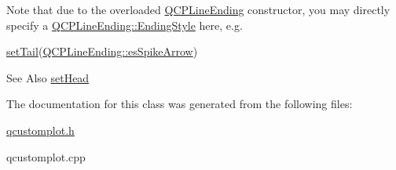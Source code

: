 Note that due to the overloaded \hyperlink{classQCPLineEnding}{Q\-C\-P\-Line\-Ending} constructor, you may directly specify a \hyperlink{classQCPLineEnding_a5ef16e6876b4b74959c7261d8d4c2cd5}{Q\-C\-P\-Line\-Ending\-::\-Ending\-Style} here, e.\-g.
\begin{DoxyCode}
\hyperlink{classQCPItemCurve_ac3488d8b1a6489c845dc5bff3ef71124}{setTail}(\hyperlink{classQCPLineEnding_a5ef16e6876b4b74959c7261d8d4c2cd5ab9964d0d03f812d1e79de15edbeb2cbf}{QCPLineEnding::esSpikeArrow}) 
\end{DoxyCode}


\begin{DoxySeeAlso}{See Also}
\hyperlink{classQCPItemCurve_a08a30d9cdd63995deea3d9e20430676f}{set\-Head} 
\end{DoxySeeAlso}


The documentation for this class was generated from the following files\-:\begin{DoxyCompactItemize}
\item 
\hyperlink{qcustomplot_8h}{qcustomplot.\-h}\item 
qcustomplot.\-cpp\end{DoxyCompactItemize}
